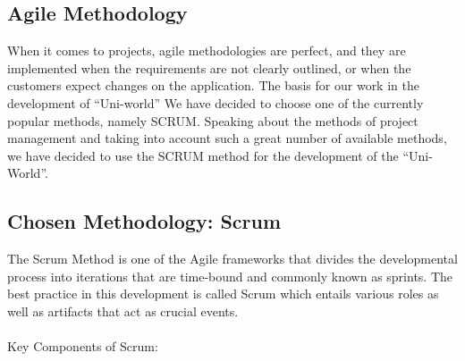 \subsection{Agile Methodology}
When it comes to projects, agile methodologies are perfect, and they are implemented when the requirements are not clearly outlined, or when the customers expect changes on the application. The basis for our work in the development of “Uni-world” We have decided to choose one of the currently popular methods, namely SCRUM.
Speaking about the methods of project management and taking into account such a great number of available methods, we have decided to use the SCRUM method for the development of the “Uni-World”. \\

\subsection{Chosen Methodology: Scrum}
The Scrum Method is one of the Agile frameworks that divides the developmental process into iterations that are time-bound and commonly known as sprints. The best practice in this development is called Scrum which entails various roles as well as artifacts that act as crucial events. \\ \\
Key Components of Scrum: 
